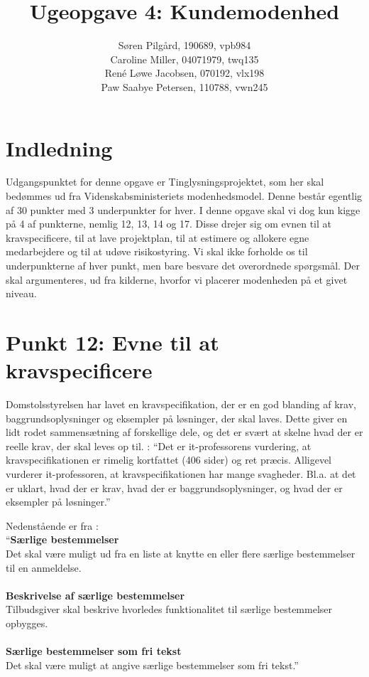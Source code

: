 \documentclass[10pt,a4paper,danish]{article}
\title{Ugeopgave 4: Kundemodenhed}
\author{Søren Pilgård, 190689, vpb984\\
Caroline Miller, 04071979, twq135\\
René Løwe Jacobsen, 070192, vlx198\\
Paw Saabye Petersen, 110788, vwn245}
\begin{document}
\maketitle
\newpage


\section{Indledning}
Udgangspunktet for denne opgave er Tinglysningsprojektet, som her skal bedømmes ud fra Videnskabsministeriets modenhedsmodel. Denne består egentlig af 30 punkter med 3 underpunkter for hver. I denne opgave skal vi dog kun kigge på 4 af punkterne, nemlig 12, 13, 14 og 17. Disse drejer sig om evnen til at kravspecificere, til at lave projektplan, til at estimere og allokere egne medarbejdere og til at udøve risikostyring. Vi skal ikke forholde os til underpunkterne af hver punkt, men bare besvare det overordnede spørgsmål. Der skal argumenteres, ud fra kilderne, hvorfor vi placerer modenheden på et givet niveau.


\section{Punkt 12: Evne til at kravspecificere}
Domstolsstyrelsen har lavet en kravspecifikation, der er en god blanding af krav, baggrundsoplysninger og eksempler på løsninger, der skal laves. Dette giver en lidt rodet sammensætning af forskellige dele, og det er svært at skelne hvad der er reelle krav, der skal leves op til. \cite[s.~17]{Rigs}: ``Det er it-professorens vurdering, at kravspecifikationen er rimelig kortfattet (406 sider) og ret præcis. Alligevel vurderer it-professoren, at kravspecifikationen har mange svagheder. Bl.a. at det er uklart, hvad der er krav, hvad der er baggrundsoplysninger, og hvad der er eksempler på løsninger.''

Nedenstående er fra \cite[s.~96]{Krav}:\\
``\textbf{Særlige bestemmelser}\\
Det skal være muligt ud fra en liste at knytte en eller flere særlige bestemmelser til en anmeldelse.\\
\\
\textbf{Beskrivelse af særlige bestemmelser}\\
Tilbudsgiver skal beskrive hvorledes funktionalitet til særlige bestemmelser opbygges.\\
\\
\textbf{Særlige bestemmelser som fri tekst}\\
Det skal være muligt at angive særlige bestemmelser som fri tekst.''\\
\end{document}
